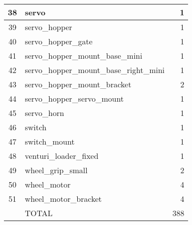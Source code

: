 \begin{longtable}{clr}
	38       & servo                                   & 1                        \\ \hline
	39       & servo\_hopper                           & 1                        \\ \hline
	40       & servo\_hopper\_gate                     & 1                        \\ \hline
	41       & servo\_hopper\_mount\_base\_mini        & 1                        \\ \hline
	42       & servo\_hopper\_mount\_base\_right\_mini & 1                        \\ \hline
	43       & servo\_hopper\_mount\_bracket           & 2                        \\ \hline
	44       & servo\_hopper\_servo\_mount             & 1                        \\ \hline
	45       & servo\_horn                             & 1                        \\ \hline
	46       & switch                                  & 1                        \\ \hline
	47       & switch\_mount                           & 1                        \\ \hline
	48       & venturi\_loader\_fixed                  & 1                        \\ \hline
	49       & wheel\_grip\_small                      & 2                        \\ \hline
	50       & wheel\_motor                            & 4                        \\ \hline
	51       & wheel\_motor\_bracket                   & 4                        \\ \hline
	& TOTAL                                   & 388                      \\ \hline
\end{longtable}